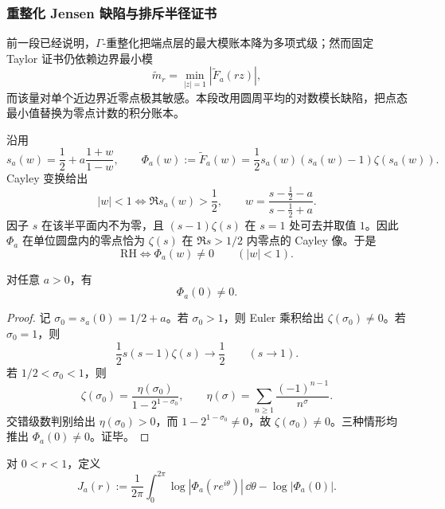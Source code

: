 \subsubsection{重整化 Jensen 缺陷与排斥半径证书}\label{subsubsec:typed-address-biaxial-completion-renormalized-jensen-defect-certificate}
前一段已经说明，\(\Gamma\)-重整化把端点层的最大模账本降为多项式级；然而固定 Taylor 证书仍依赖边界最小模
\[
\widetilde m_r=\min_{|z|=1}|\widetilde F_a(rz)|,
\]
而该量对单个近边界近零点极其敏感。本段改用圆周平均的对数模长缺陷，把点态最小值替换为零点计数的积分账本。

沿用
\[
s_a(w)=\frac12+a\frac{1+w}{1-w},
\qquad
\Phi_a(w):=\widetilde F_a(w)
=
\frac12s_a(w)(s_a(w)-1)\zeta(s_a(w)).
\]
Cayley 变换给出
\[
|w|<1
\iff
\Re s_a(w)>\frac12,
\qquad
w=\frac{s-\frac12-a}{s-\frac12+a}.
\]
因子 \(s\) 在该半平面内不为零，且 \((s-1)\zeta(s)\) 在 \(s=1\) 处可去并取值 \(1\)。因此 \(\Phi_a\) 在单位圆盘内的零点恰为 \(\zeta(s)\) 在 \(\Re s>1/2\) 内零点的 Cayley 像。于是
\[
\mathrm{RH}
\iff
\Phi_a(w)\ne0\qquad(|w|<1).
\]

\begin{lemma}[重整化基点非零]\label{lem:typed-address-biaxial-completion-renormalized-basepoint-nonzero}
对任意 \(a>0\)，有
\[
\Phi_a(0)\ne0.
\]
\end{lemma}
\begin{proof}
记 \(\sigma_0=s_a(0)=1/2+a\)。若 \(\sigma_0>1\)，则 Euler 乘积给出 \(\zeta(\sigma_0)\ne0\)。若 \(\sigma_0=1\)，则
\[
\frac12s(s-1)\zeta(s)\longrightarrow \frac12
\qquad(s\to1).
\]
若 \(1/2<\sigma_0<1\)，则
\[
\zeta(\sigma_0)=\frac{\eta(\sigma_0)}{1-2^{1-\sigma_0}},
\qquad
\eta(\sigma)=\sum_{n\ge1}\frac{(-1)^{n-1}}{n^\sigma}.
\]
交错级数判别给出 \(\eta(\sigma_0)>0\)，而 \(1-2^{1-\sigma_0}\ne0\)，故 \(\zeta(\sigma_0)\ne0\)。三种情形均推出 \(\Phi_a(0)\ne0\)。证毕。
\end{proof}

\begin{definition}\label{def:typed-address-biaxial-completion-renormalized-jensen-defect}
对 \(0<r<1\)，定义
\[
J_a(r)
:=
\frac1{2\pi}
\int_0^{2\pi}\log|\Phi_a(re^{i\theta})|\,\dd\theta
-\log|\Phi_a(0)|.
\]
\end{definition}

